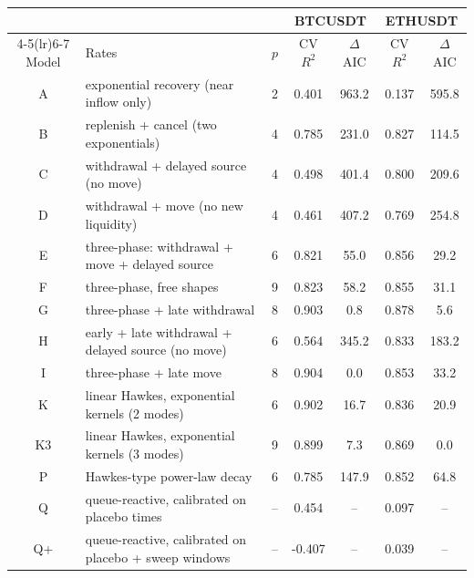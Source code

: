 \begin{tabular}{clccccc}
\toprule
 & & & \multicolumn{2}{c}{BTCUSDT} & \multicolumn{2}{c}{ETHUSDT} \\
\cmidrule(lr){4-5}\cmidrule(lr){6-7}
Model & Rates & $p$ & CV $R^2$ & $\Delta$AIC & CV $R^2$ & $\Delta$AIC \\
\midrule
A & exponential recovery (near inflow only) & 2 & 0.401 & 963.2 & 0.137 & 595.8 \\
B & replenish + cancel (two exponentials) & 4 & 0.785 & 231.0 & 0.827 & 114.5 \\
C & withdrawal + delayed source (no move) & 4 & 0.498 & 401.4 & 0.800 & 209.6 \\
D & withdrawal + move (no new liquidity) & 4 & 0.461 & 407.2 & 0.769 & 254.8 \\
E & three-phase: withdrawal + move + delayed source & 6 & 0.821 & 55.0 & 0.856 & 29.2 \\
F & three-phase, free shapes & 9 & 0.823 & 58.2 & 0.855 & 31.1 \\
G & three-phase + late withdrawal & 8 & 0.903 & 0.8 & 0.878 & 5.6 \\
H & early + late withdrawal + delayed source (no move) & 6 & 0.564 & 345.2 & 0.833 & 183.2 \\
I & three-phase + late move & 8 & 0.904 & 0.0 & 0.853 & 33.2 \\
K & linear Hawkes, exponential kernels (2 modes) & 6 & 0.902 & 16.7 & 0.836 & 20.9 \\
K3 & linear Hawkes, exponential kernels (3 modes) & 9 & 0.899 & 7.3 & 0.869 & 0.0 \\
P & Hawkes-type power-law decay & 6 & 0.785 & 147.9 & 0.852 & 64.8 \\
Q & queue-reactive, calibrated on placebo times & -- & 0.454 & -- & 0.097 & -- \\
Q+ & queue-reactive, calibrated on placebo + sweep windows & -- & -0.407 & -- & 0.039 & -- \\
\bottomrule
\end{tabular}
